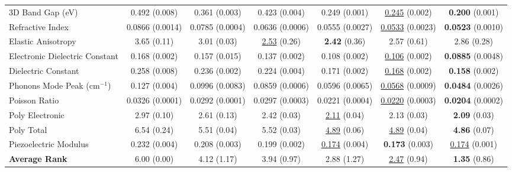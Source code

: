 \begin{table*}[!th]
{\begin{tabular}{lcccccc}
3D Band Gap (eV)               & 0.492 \scriptsize{(0.008)}  & 0.361 \scriptsize{(0.003)}  & 0.423 \scriptsize{(0.004)} & 0.249 \scriptsize{(0.001)} & \underline{0.245} \scriptsize{(0.002)} & \textbf{0.200} \scriptsize{(0.001)} \\
Refractive Index               & 0.0866 \scriptsize{(0.0014)}  & 0.0785 \scriptsize{(0.0004)}  & 0.0636 \scriptsize{(0.0006)} & 0.0555 \scriptsize{(0.0027)} & \underline{0.0533} \scriptsize{(0.0023)} & \textbf{0.0523} \scriptsize{(0.0010)} \\
Elastic Anisotropy             & 3.65 \scriptsize{(0.11)} & 3.01 \scriptsize{(0.03)}  & \underline{2.53} \scriptsize{(0.26)} & \textbf{2.42} \scriptsize{(0.36)} & 2.57 \scriptsize{(0.61)} & 2.86 \scriptsize{(0.28)} \\
Electronic Dielectric Constant & 0.168 \scriptsize{(0.002)}  & 0.157 \scriptsize{(0.015)} & 0.137 \scriptsize{(0.002)} & 0.108 \scriptsize{(0.002)} & \underline{0.106} \scriptsize{(0.002)}  & \textbf{0.0885} \scriptsize{(0.0048)} \\
Dielectric Constant            & 0.258 \scriptsize{(0.008)}  & 0.236 \scriptsize{(0.002)} & 0.224 \scriptsize{(0.004)} & 0.171 \scriptsize{(0.002)} & \underline{0.168} \scriptsize{(0.002)} & \textbf{0.158} \scriptsize{(0.002)} \\
Phonons Mode Peak (cm$^{-1}$)   & 0.127 \scriptsize{(0.004)}  & 0.0996 \scriptsize{(0.0083)}  & 0.0859 \scriptsize{(0.0006)} & 0.0596 \scriptsize{(0.0065)} & \underline{0.0568} \scriptsize{(0.0009)} & \textbf{0.0484} \scriptsize{(0.0026)} \\
Poisson Ratio                  & 0.0326 \scriptsize{(0.0001)}  & 0.0292 \scriptsize{(0.0001)}  & 0.0297 \scriptsize{(0.0003)} & 0.0221 \scriptsize{(0.0004)} & \underline{0.0220} \scriptsize{(0.0003)} & \textbf{0.0204} \scriptsize{(0.0002)} \\
Poly Electronic                & 2.97 \scriptsize{(0.10)}  & 2.61 \scriptsize{(0.13)}  & 2.42 \scriptsize{(0.03)} & \underline{2.11} \scriptsize{(0.04)} & 2.13 \scriptsize{(0.03)} & \textbf{2.09} \scriptsize{(0.03)} \\
Poly Total                     & 6.54 \scriptsize{(0.24)}  & 5.51 \scriptsize{(0.04)}  & 5.52 \scriptsize{(0.03)} & \underline{4.89} \scriptsize{(0.06)} & \underline{4.89} \scriptsize{(0.04)} & \textbf{4.86} \scriptsize{(0.07)} \\
Piezoelectric Modulus           & 0.232 \scriptsize{(0.004)}  & 0.208 \scriptsize{(0.003)}  & 0.199 \scriptsize{(0.002)} & \underline{0.174} \scriptsize{(0.004)}& \textbf{0.173} \scriptsize{(0.003)} & \underline{0.174} \scriptsize{(0.001)} \\
\midrule
\textbf{Average Rank}         & 6.00 \scriptsize{(0.00)} & 4.12 \scriptsize{(1.17)} & 3.94 \scriptsize{(0.97)} & 2.88 \scriptsize{(1.27)} & \underline{2.47} \scriptsize{(0.94)} & \textbf{1.35} \scriptsize{(0.86)} \\
\bottomrule[1pt]
\end{tabular}
}
\label{tab:main}
\end{table*}